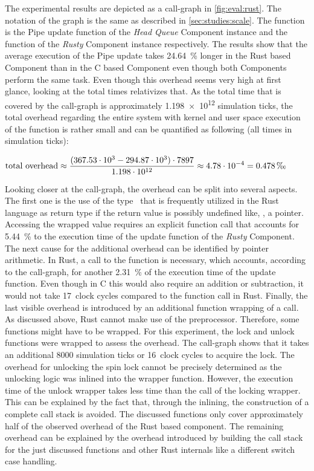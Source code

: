 The experimental results are depicted as a call-graph in \cref{fig:eval:rust}. The notation of the graph is the same as described in \cref{sec:studies:scale}. The function  is the Pipe update function of the \emph{Head Queue} Component instance and the  function of the \emph{Rusty} Component instance respectively. The results show that the average execution of the Pipe update takes \SI{24.64}{\percent} longer in the Rust based Component than in the C based Component even though both Components perform the same task. Even though this overhead seems very high at first glance, looking at the total times relativizes that. As the total time that is covered by the call-graph is approximately \num{1.198e12} simulation ticks, the total overhead regarding the entire system with kernel and user space execution of the  function is rather small and can be quantified as following (all times in simulation ticks):
\begin{center}
	\(\text{total overhead} \approx \displaystyle\frac{(367.53 \cdot 10^3 - 294.87 \cdot 10^3) \cdot 7897}{1.198 \cdot 10^{12}} \approx 4.78 \cdot 10^{-4} = 0.478 \text{\,\textperthousand}\)
\end{center}

Looking closer at the call-graph, the overhead can be split into several aspects. The first one is the use of the  type~\cite{rust_doc} that is frequently utilized in the Rust language as return type if the return value is possibly undefined like, \eg{}, a  pointer. Accessing the wrapped value requires an explicit  function call that accounts for \SI{5.44}{\percent} to the execution time of the update function of the \emph{Rusty} Component. The next cause for the additional overhead can be identified by pointer arithmetic. In Rust, a call to the  function is necessary, which accounts, according to the call-graph, for another \SI{2.31}{\percent} of the execution time of the update function. Even though in C this would also require an addition or subtraction, it would not take 17~clock cycles compared to the function call in Rust. Finally, the last visible overhead is introduced by an additional function wrapping of a \cobas{} call. As discussed above, Rust cannot make use of the preprocessor. Therefore, some functions might have to be wrapped. For this experiment, the lock and unlock functions were wrapped to assess the overhead. The call-graph shows that it takes an additional \num{8000} simulation ticks or 16~clock cycles to acquire the lock. The overhead for unlocking the spin lock cannot be precisely determined as the unlocking logic was inlined into the wrapper function. However, the execution time of the unlock wrapper takes less time than the call of the locking wrapper. This can be explained by the fact that, through the inlining, the construction of a complete call stack is avoided. The discussed functions only cover approximately half of the observed overhead of the Rust based component. The remaining overhead can be explained by the overhead introduced by building the call stack for the just discussed functions and other Rust internals like a different switch case handling.

